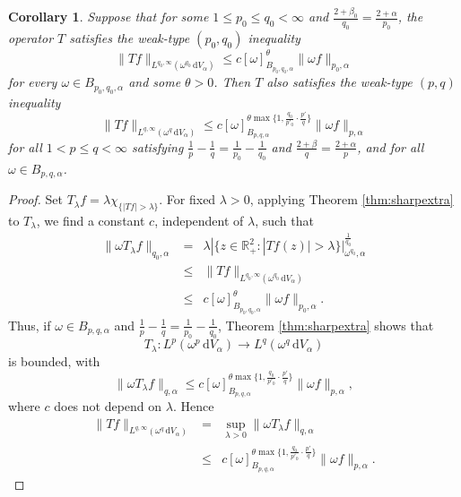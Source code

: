 \documentclass[10pt,a4paper]{amsart}
\newtheorem{corollary}{Corollary}
\begin{document}
\begin{corollary}\label{cor:weaksharpextra}
Suppose that for some $1\le p_0\le q_0<\infty$ and $\frac{2+\beta_0}{q_0}= \frac{2+\alpha}{p_0}$, the operator $T$ satisfies the weak-type $(p_0,q_0)$ inequality
$$\| Tf\|_{L^{q_0,\infty}(\omega^{q_0}\,\mathrm{d}V_{\alpha})}\le c[\omega]_{B_{p_0,q_0,\alpha}}^{\theta}\|\omega f\|_{p_0,\alpha}$$
for every $\omega\in B_{p_0,q_0,\alpha}$ and some $\theta>0$. Then $T$ also satisfies the weak-type $(p,q)$ inequality
$$\| Tf\|_{L^{q,\infty}(\omega^{q}\,\mathrm{d}V_{\alpha})}\le c[\omega]_{B_{p,q,\alpha}}^{\theta\max\{1,\frac{q_0}{p'_0}\cdot\frac{p'}{q}\}}\|\omega f\|_{p,\alpha}$$
for all $1<p\le q<\infty$ satisfying $\frac{1}{p}-\frac{1}{q} = \frac{1}{p_0} - \frac{1}{q_0}$ and $\frac{2+\beta}{q} = \frac{2+\alpha}{p}$, and for all $\omega\in B_{p,q,\alpha}$.
\end{corollary}

\begin{proof}
Set $T_{\lambda}f = \lambda\chi_{\{|Tf|>\lambda\}}$. For fixed $\lambda>0$, applying Theorem \ref{thm:sharpextra} to $T_{\lambda}$, we find a constant $c$, independent of $\lambda$, such that
\begin{eqnarray*}
\|\omega T_{\lambda}f\|_{q_0,\alpha} & = & \lambda|\{z\in\mathbb{R}_+^2:|Tf(z)|>\lambda\}|_{\omega^{q_0},\alpha}^{\frac{1}{q_0}}\\
 & \le & \|Tf\|_{L^{q_0,\infty}(\omega^{q_0}\,\mathrm{d}V_{\alpha})}\\
 & \le & c[\omega]_{B_{p_0,q_0,\alpha}}^{\theta}\|\omega f\|_{p_0,\alpha}.
\end{eqnarray*}
Thus, if $\omega\in B_{p,q,\alpha}$ and $\frac{1}{p} - \frac{1}{q} = \frac{1}{p_0} - \frac{1}{q_0}$, Theorem \ref{thm:sharpextra} shows that
$$T_{\lambda}: L^p(\omega^p\,\mathrm{d}V_{\alpha})\longrightarrow L^q(\omega^q\,\mathrm{d}V_{\alpha})$$
is bounded, with
$$\| \omega T_{\lambda}f\|_{q,\alpha}\le c[\omega]_{B_{p,q,\alpha}}^{\theta\max\{1,\frac{q_0}{p'_0}\cdot\frac{p'}{q}\}}\|\omega f\|_{p,\alpha},$$
where $c$ does not depend on $\lambda$. Hence
\begin{eqnarray*}
\| Tf\|_{L^{q,\infty}(\omega^{q}\,\mathrm{d}V_{\alpha})} & = & \sup_{\lambda>0}\|\omega T_{\lambda}f\|_{q,\alpha}\\
&\le& c[\omega]_{B_{p,q,\alpha}}^{\theta\max\{1,\frac{q_0}{p'_0}\cdot\frac{p'}{q}\}}\|\omega f\|_{p,\alpha}.
\end{eqnarray*}
\end{proof}
\end{document}
